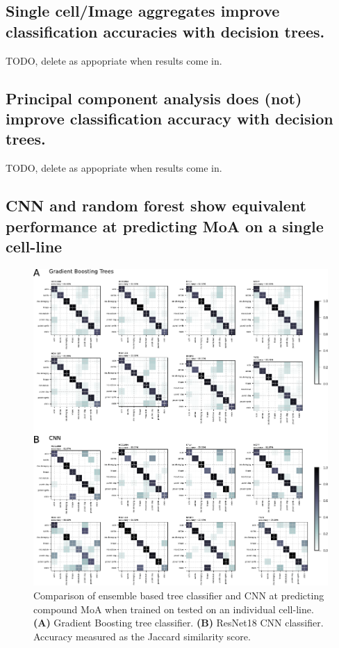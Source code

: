 \documentclass[a4paper,11pt,twoside,openright]{scrbook}
\begin{document}
\subsection{Single cell/Image aggregates improve classification accuracies with decision trees.}
TODO, delete as appopriate when results come in.

\subsection{Principal component analysis does (not) improve classification accuracy with decision trees.}
TODO, delete as appopriate when results come in.

\subsection{CNN and random forest show equivalent performance at predicting MoA on a single cell-line}

\begin{figure}
    \includegraphics[width=1.0\textwidth]{ch2SingleCellLine}
    \captionsetup{width=0.8\textwidth}
    \caption[Classifying MoA on a single cell-line]{Comparison of ensemble based tree classifier and CNN at predicting compound MoA when trained on tested on an individual cell-line.
    \textbf{(A)} Gradient Boosting tree classifier.
    \textbf{(B)} ResNet18 CNN classifier.
Accuracy measured as the Jaccard similarity score.
    }
    \label{figure:single_cell_line}
\end{figure}
\end{document}
